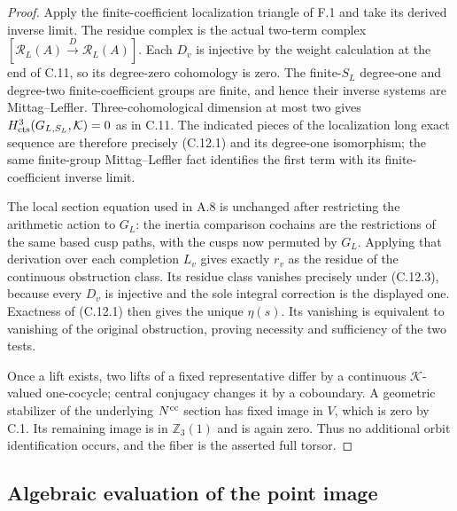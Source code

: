 \begin{proof}
Apply the finite-coefficient localization triangle
of F.1 and take its derived inverse limit.
The residue complex is the actual two-term complex
$[\mathcal R_L(A)\xrightarrow D\mathcal R_L(A)]$.
Each $D_v$ is injective by the weight calculation
at the end of C.11, so its degree-zero cohomology
is zero.  The finite-$S_L$ degree-one and degree-two
finite-coefficient groups are finite, and hence
their inverse systems are Mittag--Leffler.
Three-cohomological dimension at most two gives
$H^3_{\rm cts}(G_{L,S_L},\mathcal K)=0$ as in C.11.
The indicated pieces of the localization long
exact sequence are therefore precisely (C.12.1)
and its degree-one isomorphism; the same finite-group
Mittag--Leffler fact identifies the first term
with its finite-coefficient inverse limit.

The local section equation used in A.8 is unchanged
after restricting the arithmetic action to $G_L$:
the inertia comparison cochains are the restrictions
of the same based cusp paths, with the cusps now
permuted by $G_L$.  Applying that derivation over
each completion $L_v$ gives exactly $r_v$ as the
residue of the continuous obstruction class.
Its residue class vanishes precisely under
(C.12.3), because every $D_v$ is injective and
the sole integral correction is the displayed one.
Exactness of (C.12.1) then gives the unique
$\eta(s)$.  Its vanishing is equivalent to
vanishing of the original obstruction, proving
necessity and sufficiency of the two tests.

Once a lift exists, two lifts of a fixed
representative differ by a continuous
$\mathcal K$-valued one-cocycle; central
conjugacy changes it by a coboundary.
A geometric stabilizer of the underlying
$N^{\rm cc}$ section has fixed image in $V$,
which is zero by C.1.  Its remaining image is
in $\mathbb Z_3(1)$ and is again zero.
Thus no additional orbit identification occurs,
and the fiber is the asserted full torsor.
\end{proof}

\subsection{Algebraic evaluation of the point image}

